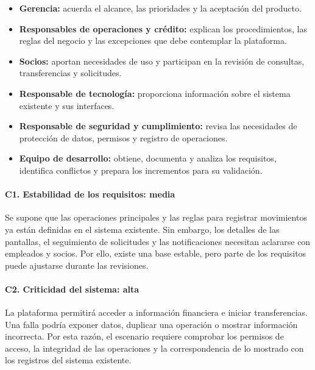 \begin{itemize}
	\item \textbf{Gerencia:} acuerda el alcance, las prioridades y la aceptación del producto.
	
	\item \textbf{Responsables de operaciones y crédito:} explican los procedimientos, las reglas del negocio y las excepciones que debe contemplar la plataforma.
	
	\item \textbf{Socios:} aportan necesidades de uso y participan en la revisión de consultas, transferencias y solicitudes.
	
	\item \textbf{Responsable de tecnología:} proporciona información sobre el sistema existente y sus interfaces.
	
	\item \textbf{Responsable de seguridad y cumplimiento:} revisa las necesidades de protección de datos, permisos y registro de operaciones.
	
	\item \textbf{Equipo de desarrollo:} obtiene, documenta y analiza los requisitos, identifica conflictos y prepara los incrementos para su validación.
\end{itemize}

\paragraph{C1. Estabilidad de los requisitos: media}

Se supone que las operaciones principales y las reglas para registrar movimientos ya están definidas en el sistema existente. Sin embargo, los detalles de las pantallas, el seguimiento de solicitudes y las notificaciones necesitan aclararse con empleados y socios. Por ello, existe una base estable, pero parte de los requisitos puede ajustarse durante las revisiones.

\paragraph{C2. Criticidad del sistema: alta}

La plataforma permitirá acceder a información financiera e iniciar transferencias. Una falla podría exponer datos, duplicar una operación o mostrar información incorrecta. Por esta razón, el escenario requiere comprobar los permisos de acceso, la integridad de las operaciones y la correspondencia de lo mostrado con los registros del sistema existente.

